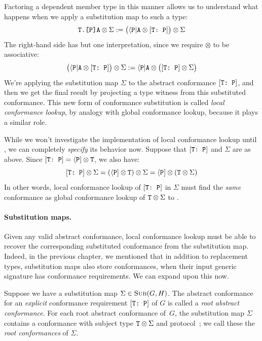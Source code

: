 \documentclass[../generics]{subfiles}
\begin{document}
Factoring a dependent member type in this manner allows us to understand what happens when we apply a substitution map to such a type:
\[\texttt{T.[P]A}\otimes\Sigma:=\bigl(\langle\texttt{P}|\texttt{A} \otimes [\texttt{T:~P}]\bigr)\otimes\Sigma\]
The right-hand side has but one interpretation, since we require $\otimes$ to be associative:
\[\bigl(\langle\texttt{P}|\texttt{A} \otimes [\texttt{T:~P}]\bigr)\otimes\Sigma := \langle\texttt{P}|\texttt{A}\otimes\bigl([\texttt{T:~P}]\otimes\Sigma\bigr)\]
We're applying the substitution map $\Sigma$ to the abstract conformance $[\texttt{T:~P}]$, and then we get the final result by projecting a type witness from this substituted conformance. This new form of conformance substitution is called \emph{local conformance lookup}, by analogy with global conformance lookup, because it plays a similar role.

While we won't investigate the implementation of local conformance lookup until , we can completely \emph{specify} its behavior now. Suppose that $[\texttt{T:~P}]$ and $\Sigma$ are as above. Since $[\texttt{T:~P}]=\langle\texttt{P}]\otimes\texttt{T}$, we also have:
\[[\texttt{T:~P}]\otimes\Sigma=(\langle\texttt{P}]\otimes\texttt{T})\otimes\Sigma=\langle\texttt{P}]\otimes(\texttt{T}\otimes\Sigma)\]
In other words, local conformance lookup of $[\texttt{T:~P}]$ in $\Sigma$ must find the \emph{same} conformance as global conformance lookup of $\texttt{T}\otimes\Sigma$ to \tP.

\paragraph{Substitution maps.}
Given any valid abstract conformance, local conformance lookup must be able to recover the corresponding substituted conformance from the substitution map. Indeed, in the previous chapter, we mentioned that in addition to replacement types, substitution maps also store conformances, when their input generic signature has conformance requirements. We can expand upon this now.

Suppose we have a substitution map $\Sigma\in\textsc{Sub}({G, H})$. The abstract conformance for an \emph{explicit} conformance requirement $[\texttt{T:~P}]$ of $G$ is called a \emph{root abstract conformance}. For each root abstract conformance of~$G$, the substitution map $\Sigma$ contains a conformance with subject type $\texttt{T}\otimes\Sigma$ and protocol~\tP; we call these the \emph{root conformances} of $\Sigma$.
\end{document}
